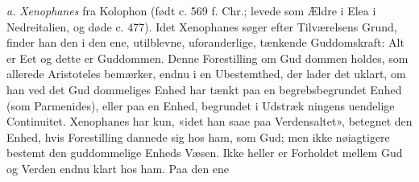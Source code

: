 \documentclass[12pt,a4paper]{book}
\begin{document}
\textit{a.} \emph{Xenophanes} fra Kolophon (født c. 569 f. Chr.;
levede som Ældre i Elea i Nedreitalien, og døde c. 477). Idet
Xenophanes søger efter Tilværelsens Grund, finder han den i den
ene, utilblevne, uforanderlige, tænkende Guddomskraft: Alt
er Eet og dette er Guddommen. Denne Forestilling om Gud\-%
dommen holdes, som allerede Aristoteles bemærker, endnu i
en Ubestemthed, der lader det uklart, om han ved det Gud\-%
dommeliges Enhed har tænkt paa en begrebsbegrundet Enhed
(som Parmenides), eller paa en Enhed, begrundet i Udstræk\-%
ningens uendelige Continuitet. Xenophanes har kun, «idet han
saae paa Verdensaltet», betegnet den Enhed, hvis Forestilling
dannede sig hos ham, som Gud; men ikke nøiagtigere bestemt
den guddommelige Enheds Væsen. Ikke heller er Forholdet
mellem Gud og Verden endnu klart hos ham. Paa den ene
\end{document}
